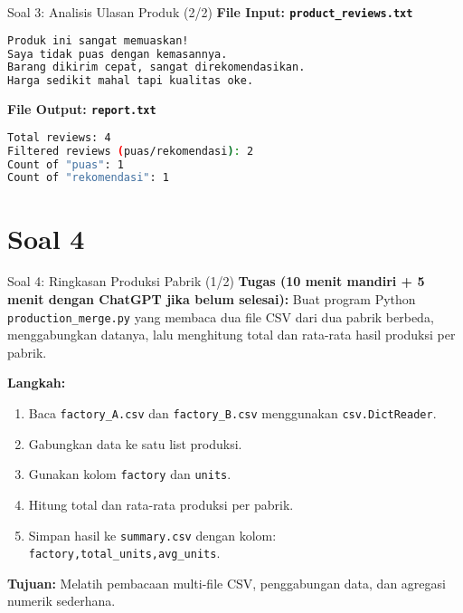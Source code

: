 \documentclass[aspectratio=169, table]{beamer}
\begin{document}
\begin{frame}[fragile]{Soal 3: Analisis Ulasan Produk (2/2)}
\vspace{15pt}
\textbf{File Input: \texttt{product\_reviews.txt}}
\begin{lstlisting}[language=bash,basicstyle=\ttfamily\small]
Produk ini sangat memuaskan!
Saya tidak puas dengan kemasannya.
Barang dikirim cepat, sangat direkomendasikan.
Harga sedikit mahal tapi kualitas oke.
\end{lstlisting}

\textbf{File Output: \texttt{report.txt}}
\begin{lstlisting}[language=bash,basicstyle=\ttfamily\small]
Total reviews: 4
Filtered reviews (puas/rekomendasi): 2
Count of "puas": 1
Count of "rekomendasi": 1
\end{lstlisting}
\end{frame}


\section{Soal 4}
\begin{frame}[fragile]{Soal 4: Ringkasan Produksi Pabrik (1/2)}
\vspace{10pt}
\textbf{Tugas (10 menit mandiri + 5 menit dengan ChatGPT jika belum selesai):}  
Buat program Python \texttt{production\_merge.py} yang membaca dua file CSV dari dua pabrik berbeda, menggabungkan datanya, lalu menghitung total dan rata-rata hasil produksi per pabrik.

\textbf{Langkah:}
\begin{enumerate}
  \item Baca \texttt{factory\_A.csv} dan \texttt{factory\_B.csv} menggunakan \texttt{csv.DictReader}.
  \item Gabungkan data ke satu list produksi.
  \item Gunakan kolom \texttt{factory} dan \texttt{units}.
  \item Hitung total dan rata-rata produksi per pabrik.
  \item Simpan hasil ke \texttt{summary.csv} dengan kolom:  
        \texttt{factory,total\_units,avg\_units}.
\end{enumerate}
\textbf{Tujuan:}  
Melatih pembacaan multi-file CSV, penggabungan data, dan agregasi numerik sederhana.
\end{frame}
\end{document}
